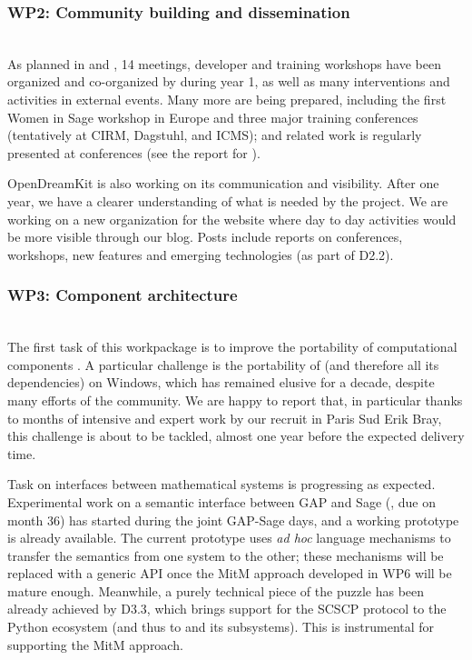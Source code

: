 \documentclass{deliverablereport}
\begin{document}
\subsubsection{WP2: Community building and dissemination}

~\\As planned in  and
, 14 meetings, developer and training
workshops have been organized and co-organized by \ODK during year 1,
as well as many interventions and activities in external events.
Many more are being prepared, including the first Women in Sage
workshop in Europe and three major training conferences (tentatively
at CIRM, Dagstuhl, and ICMS); \ODK and \ODK related work is regularly
presented at conferences (see the report for
).

OpenDreamKit is also working on its communication and visibility. After
one year, we have a clearer understanding of what is needed by the project.
We are working on a new organization for the website where day to day activities
would be more visible through our blog. Posts include reports on conferences, workshops,
new features and emerging technologies (as part of D2.2).


\subsubsection{WP3: Component architecture}

~\\The first task of this workpackage is to improve the portability of
computational components
. A particular challenge
is the portability of \Sage (and therefore all its dependencies)
on Windows, which has remained elusive for a decade, despite many
efforts of the community. We are happy to report that, in particular
thanks to months of intensive and expert work by our recruit in Paris
Sud Erik Bray, this challenge is about to be tackled, almost one year
before the expected delivery time.

Task  on interfaces
between mathematical systems is progressing as expected. Experimental
work on a semantic interface between GAP and Sage
(, due
on month 36) has started during the joint GAP-Sage days, and a working
prototype is already available. The current prototype uses \emph{ad
  hoc} language mechanisms to transfer the semantics from one system
to the other; these mechanisms will be replaced with a generic API
once the MitM approach developed in WP6 will be mature
enough. Meanwhile, a purely technical piece of the puzzle has been
already achieved by D3.3, which brings support for the SCSCP protocol
to the Python ecosystem (and thus to \Sage and its subsystems). This
is instrumental for supporting the MitM approach.
\end{document}
